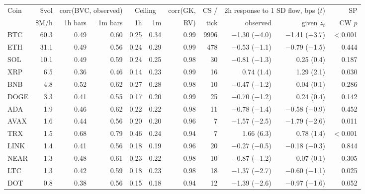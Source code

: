 \begin{tabular}{lrrrrrrrrrr}
\toprule
Coin & \$vol & \multicolumn{2}{c}{corr(BVC, observed)} & \multicolumn{2}{c}{Ceiling} & corr(GK, & CS / & \multicolumn{2}{c}{2h response to 1 SD flow, bps ($t$)} & SP\\
\cmidrule(lr){3-4}\cmidrule(lr){5-6}\cmidrule(lr){9-10} & \$M/h & 1h bars & 1m bars & 1h & 1m & RV) & tick & observed & given $z_t$ & CW $p$\\
\midrule
BTC & 60.3 & 0.49 & 0.60 & 0.25 & 0.34 & 0.99 & 9996 & \ensuremath{-}1.30 (\ensuremath{-}4.0) & \ensuremath{-}1.41 (\ensuremath{-}3.7) & $<$0.001\\
ETH & 31.1 & 0.49 & 0.56 & 0.24 & 0.29 & 0.99 & 478 & \ensuremath{-}0.53 (\ensuremath{-}1.1) & \ensuremath{-}0.79 (\ensuremath{-}1.5) & 0.444\\
SOL & 10.1 & 0.49 & 0.59 & 0.24 & 0.25 & 0.98 & 30 & \ensuremath{-}0.81 (\ensuremath{-}1.3) & 0.25 (0.4) & 0.187\\
XRP & 6.5 & 0.36 & 0.46 & 0.14 & 0.23 & 0.99 & 16 & 0.74 (1.4) & 1.29 (2.1) & 0.030\\
BNB & 4.8 & 0.52 & 0.62 & 0.27 & 0.28 & 0.98 & 10 & \ensuremath{-}0.47 (\ensuremath{-}1.2) & 0.04 (0.1) & 0.286\\
DOGE & 3.3 & 0.41 & 0.55 & 0.17 & 0.20 & 0.99 & 25 & \ensuremath{-}0.70 (\ensuremath{-}1.2) & 0.24 (0.4) & 0.142\\
ADA & 1.9 & 0.46 & 0.62 & 0.22 & 0.22 & 0.98 & 11 & \ensuremath{-}0.78 (\ensuremath{-}1.4) & \ensuremath{-}0.58 (\ensuremath{-}0.9) & 0.452\\
AVAX & 1.6 & 0.44 & 0.56 & 0.20 & 0.20 & 0.96 & 7 & \ensuremath{-}1.57 (\ensuremath{-}2.5) & \ensuremath{-}1.79 (\ensuremath{-}2.6) & 0.011\\
TRX & 1.5 & 0.68 & 0.79 & 0.46 & 0.24 & 0.94 & 7 & 1.66 (6.3) & 0.78 (1.4) & $<$0.001\\
LINK & 1.4 & 0.41 & 0.56 & 0.18 & 0.19 & 0.96 & 20 & \ensuremath{-}0.27 (\ensuremath{-}0.5) & \ensuremath{-}0.18 (\ensuremath{-}0.3) & 0.844\\
NEAR & 1.3 & 0.48 & 0.61 & 0.23 & 0.22 & 0.98 & 10 & \ensuremath{-}0.87 (\ensuremath{-}1.2) & 0.07 (0.1) & 0.305\\
LTC & 1.3 & 0.42 & 0.59 & 0.18 & 0.23 & 0.98 & 18 & \ensuremath{-}1.37 (\ensuremath{-}2.7) & \ensuremath{-}0.60 (\ensuremath{-}1.1) & 0.025\\
DOT & 0.8 & 0.38 & 0.56 & 0.15 & 0.18 & 0.94 & 12 & \ensuremath{-}1.39 (\ensuremath{-}2.6) & \ensuremath{-}0.97 (\ensuremath{-}1.6) & 0.052\\

\end{tabular}
